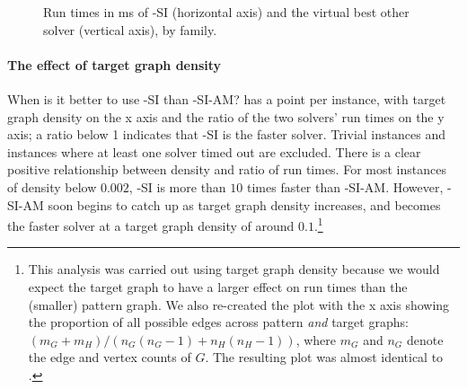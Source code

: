 \begin{figure}[htb]
    \caption{Run times in ms of \McSplit-SI (horizontal axis) and the virtual best other solver (vertical axis), by family.}
    \label{figure:mcsplitsi-vbs-scatter-by-family}
\end{figure}

\FloatBarrier

\paragraph*{The effect of target graph density}
When is it better to use \McSplit-SI than \McSplit-SI-AM?
 has a point per instance, with target graph density on the x axis and the ratio of the two solvers' run times 
on the y axis; a ratio below 1 indicates that \McSplit-SI is the faster solver.  Trivial instances and instances where at least one
solver timed out are excluded.  There is a clear positive relationship between density and ratio of run times.  For most instances of
density below $0.002$, \McSplit-SI is more than $10$ times faster than \McSplit-SI-AM.  However,
\McSplit-SI-AM soon begins to catch up as target graph density increases, and becomes the faster solver at a target graph density of around
$0.1$.\footnote{This analysis was carried out using target graph density because we would expect the target graph to have
a larger effect on run times than the (smaller) pattern graph.  We also re-created the plot with the x axis showing the proportion
of all possible edges across pattern \emph{and} target graphs: $(m_G + m_H) / (n_G(n_G-1) + n_H(n_H-1))$,
where $m_G$ and $n_G$ denote the edge and vertex counts of $G$.  The resulting
plot was almost identical to .}

